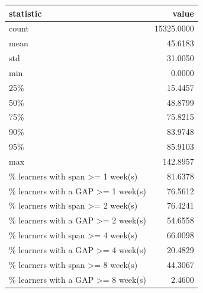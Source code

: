 \begin{tabular}{lr}
\toprule
statistic & value \\
\midrule
count & 15325.0000 \\
mean & 45.6183 \\
std & 31.0050 \\
min & 0.0000 \\
25\% & 15.4457 \\
50\% & 48.8799 \\
75\% & 75.8215 \\
90\% & 83.9748 \\
95\% & 85.9103 \\
max & 142.8957 \\
\% learners with span >= 1 week(s) & 81.6378 \\
\% learners with a GAP >= 1 week(s) & 76.5612 \\
\% learners with span >= 2 week(s) & 76.4241 \\
\% learners with a GAP >= 2 week(s) & 54.6558 \\
\% learners with span >= 4 week(s) & 66.0098 \\
\% learners with a GAP >= 4 week(s) & 20.4829 \\
\% learners with span >= 8 week(s) & 44.3067 \\
\% learners with a GAP >= 8 week(s) & 2.4600 \\
\bottomrule
\end{tabular}
